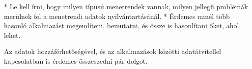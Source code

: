 
* Le kell írni, hogy milyen típusú menetrendek vannak, milyen jellegű problémák merülnek fel a menetrendi adatok nyilvántartásánál.
* Érdemes minél több hasonló alkalmazást megemlíteni, bemutatni, és össze is hasonlítani őket, ahol lehet.

Az adatok hozzáférhetőségével, és az alkalmazások közötti adatátvitellel kapcsolatban is érdemes összeszedni pár dolgot.